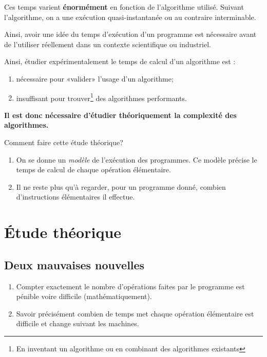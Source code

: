 Ces temps varient \textbf{énormément} en fonction de l'algorithme utilisé.
Suivant l'algorithme, on a une exécution quasi-instantanée ou au contraire interminable.

Ainsi, avoir une idée du temps d'exécution d'un programme est nécessaire avant
de l'utiliser réellement dans un contexte scientifique ou industriel.

Ainsi, étudier expérimentalement le temps de calcul d'un algorithme est :
\begin{enumerate}
\item nécessaire pour «valider» l'usage d'un algorithme;
\item insuffisant pour trouver\footnote{En inventant un
    algorithme ou en combinant des algorithmes existants} des algorithmes performants.
\end{enumerate}

\begin{center}
\textbf{Il est donc nécessaire d'étudier théoriquement la complexité
  des algorithmes.}  
\end{center}

Comment faire cette étude théorique?

\begin{enumerate}
\item On se donne un \emph{modèle} de l'exécution des programmes. Ce modèle précise le temps de calcul de chaque opération élémentaire.
\item Il ne reste plus qu'à regarder, pour un programme donné, combien d'instructions élémentaires il effectue.
\end{enumerate}

\section{Étude théorique}


\subsection{Deux mauvaises nouvelles}

\begin{enumerate}
\item Compter exactement le nombre d'opérations faites par le programme est pénible voire difficile (mathématiquement).
\item Savoir précisément combien de temps met chaque opération élémentaire est difficile et change suivant les machines.
\end{enumerate}

